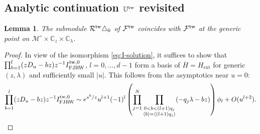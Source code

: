 \documentclass[11pt]{amsart}
\newtheorem{lem}[thm]{Lemma} %
\theoremstyle{definition} %
\theoremstyle{remark} %
\newcommand{\CC}{\mathbb C}
\newcommand{\UU}{\mathbb U}
\newcommand{\tw}{{\rm tw}}
\def\fracp#1{\left\langle #1 \right\rangle}
\newcommand{\cMo}{\mathcal{M}^\circ}
\newcommand{\cF}{\mathcal{F}}
\newcommand{\cR}{\mathcal{R}}
\newcommand{\ext}{{\operatorname{ext}}}
\newcommand{\FJRW}{{\operatorname{FJRW}}}
\newcommand{\ov}{\overline}
\begin{document}
\subsection{Analytic continuation $\UU^\tw$ revisited} 
\label{subsec:ancont-revisited}
\begin{lem}
\label{lem:almostgenerate} 
The submodule $\cR^\tw \triangle_0$ of $\cF^\tw$ coincides 
with $\cF^\tw$ at the generic point on $\cMo \times \CC_z\times 
\CC_\lambda$. 
\end{lem} 
\begin{proof} 
In view of the isomorphism \eqref{eq:I-solution}, 
it suffices to show that 
$\prod_{b=1}^l(zD_u-bz) z^{-1} I^{\tw,0}_{\FJRW}$, 
$l=0,\dots,d-1$ form a basis of $\ov{H}=H_{\ext}$ 
for generic $(z,\lambda)$ and sufficiently small $|u|$. 
This follows from the asymptotics near $u=0$: 
\[
\prod_{b=1}^l(zD_u-bz) z^{-1} I^{\tw,0}_{\FJRW} 
\sim e^{s^0/z} u^{l+1} (-1)^l 
\left( 
\prod_{j=1}^N 
\prod_{\substack{0<b<(l+1)q_j \\ \fracp{b} = \fracp{(l+1)q_j}}}
(-q_j \lambda - b z)  \right)
\phi_l + O(u^{l+2}). 
\]
\end{proof} 
\end{document}
